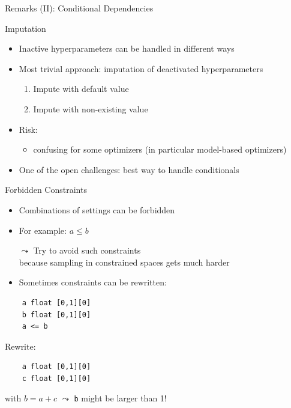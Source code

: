 \begin{frame}[c, fragile]{Remarks (II): Conditional Dependencies}

\begin{block}{Imputation}
	\begin{itemize}
		\item Inactive hyperparameters can be handled in different ways
		\item Most trivial approach: imputation of deactivated hyperparameters
		\begin{enumerate}
			\item Impute with default value
			\item Impute with non-existing value
		\end{enumerate}
		\pause
		\medskip
		\item Risk:
		\begin{itemize}
			\item confusing for some optimizers (in particular model-based optimizers)
		\end{itemize}
		\pause
		\item One of the open challenges: best way to handle conditionals
	\end{itemize}
\end{block}

\end{frame}
\begin{frame}[c, fragile]{Forbidden Constraints}

\begin{itemize}
  \item Combinations of settings can be forbidden
  \item For example: $a \leq b$
  \smallskip
  \pause
  \item[$\leadsto$] Try to avoid such constraints\\ because sampling in constrained spaces gets much harder
  \smallskip
  \item Sometimes constraints can be rewritten:
\end{itemize}

\begin{verbatim}
    a float [0,1][0]
    b float [0,1][0]
    a <= b
\end{verbatim}

Rewrite:
\begin{verbatim}
    a float [0,1][0]
    c float [0,1][0]
\end{verbatim}

with $b = a + c$ $\leadsto$ \texttt{b} might be larger than 1! 


\end{frame}
